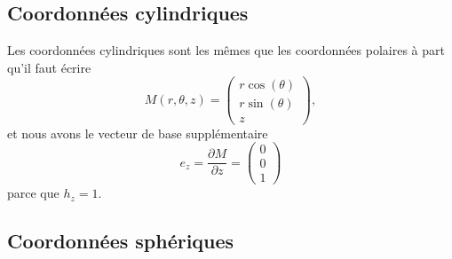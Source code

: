 \subsection{Coordonnées cylindriques}

Les coordonnées cylindriques sont les mêmes que les coordonnées polaires à part qu'il faut écrire
\begin{equation}
    M(r,\theta,z)=\begin{pmatrix}
        r\cos(\theta)    \\ 
        r\sin(\theta)    \\ 
        z    
    \end{pmatrix},
\end{equation}
et nous avons le vecteur de base supplémentaire
\begin{equation}
    e_z=\frac{ \partial M }{ \partial z }=\begin{pmatrix}
        0    \\ 
        0    \\ 
        1    
    \end{pmatrix}
\end{equation}
parce que $h_z=1$.

\subsection{Coordonnées sphériques}

